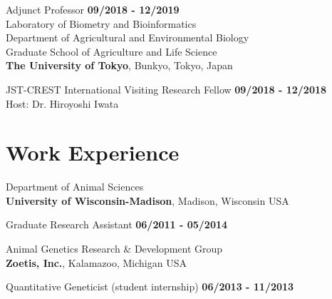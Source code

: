 \documentclass[margin,line,10pt]{res}
\begin{document}
\begin{resume}
Adjunct Professor  \hfill {\bf 09/2018 - 12/2019}\\ 



Laboratory of Biometry and Bioinformatics\\
Department of Agricultural and Environmental Biology \\
Graduate School of Agriculture and Life Science \\
{\bf The University of Tokyo}, Bunkyo, Tokyo, Japan
\vspace{-.35cm}

JST-CREST International Visiting Research Fellow  \hfill {\bf 09/2018 - 12/2018}\\
Host: Dr. Hiroyoshi Iwata


  


\vspace{0.4cm}
\section{\sc Work \phantom{1cm} Experience}
Department of Animal Sciences\\
{\bf University of Wisconsin-Madison}, Madison, Wisconsin USA
\vspace{-.35cm}

Graduate Research Assistant   \hfill {\bf 06/2011 - 05/2014}\\
\vspace{-.4cm}

Animal Genetics Research \& Development  Group \\
{\bf Zoetis, Inc.}, Kalamazoo, Michigan USA

\vspace{-.35cm}

Quantitative Geneticist (student internship)   \hfill {\bf 06/2013 - 11/2013}\\








\vspace{0.5cm}

\end{resume}
\end{document}
